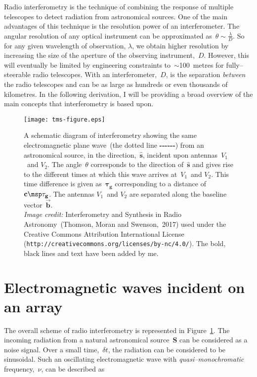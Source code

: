 Radio interferometry is the technique of combining the response of multiple telescopes to detect radiation from astronomical sources. One of the main advantages of this technique is the resolution power of an interferometer. The angular resolution of any optical instrument can be approximated as~$\theta \sim \frac{\lambda}{D}$. So for any given wavelength of observation, $\lambda $, we obtain higher resolution by increasing the size of the aperture of the observing instrument,~$D$. However, this will eventually be limited by engineering constraints to~$\sim $100~metres for fully--steerable radio telescopes. With an interferometer,~$D$, is the separation \emph{between} the radio telescopes and can be as large as hundreds or even thousands of kilometres. In the following derivation, I will be providing a broad overview of the main concepts that interferometry is based upon.

\begin{figure}
  \centering
    \texttt{[image: tms-figure.eps]}
  \caption[]{A schematic diagram of interferometry showing the same electromagnetic plane wave~(the dotted line \textbf{-}\textbf{-}\textbf{-}\textbf{-}\textbf{-}\textbf{-}) from an astronomical source, in the direction,~$\mathbf{\hat{s}}$, incident upon antennas~$V_1$~and $V_2$. The angle~$\theta $ corresponds to the direction of~$\mathbf{\hat{s}}$ and gives rise to the different times at which this wave arrives at~$V_1$~and $V_2$. This time difference is given as~$\mathbf{\tau _g}$ corresponding to a distance of~$\mathbf{c\msp \tau_ g}$. The antennas $V_1$~and $V_2$ are separated along the baseline vector~$\vec{\mathbf{b}}$.\\ \emph{Image credit:} Interferometry and Synthesis in Radio Astronomy~(Thomson, Moran and Swenson,~2017) used under the Creative Commons Attribution International License (\texttt{http://creativecommons.org/licenses/by-nc/4.0/}). The bold, black lines and text have been added by me.}
  \label{fig:tms-figure}
\end{figure}

\section{Electromagnetic waves incident on an array}
The overall scheme of radio interferometry is represented in Figure~\ref{fig:tms-figure}. The incoming radiation from a natural astronomical source~\textbf{S} can be considered as a noise signal. Over a small time,~$\delta t$, the radiation can be considered to be sinusoidal. Such an oscillating electromagnetic wave with \emph{quasi--monochromatic} frequency,~$\nu $, can be described as

